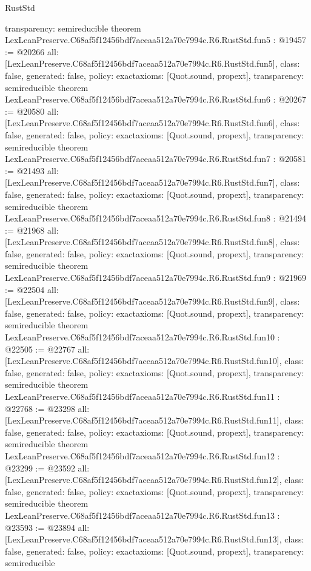 \begin{lexlean}{RustStd}
\begin{coremodule}
{  transparency: semireducible
}
theorem LexLeanPreserve.C68af5f12456bdf7aceaa512a70e7994c.R6.RustStd.fun5 : @19457 := @20266 {
  all: [LexLeanPreserve.C68af5f12456bdf7aceaa512a70e7994c.R6.RustStd.fun5],
  class: false,
  generated: false,
  policy: exact{axioms: [Quot.sound, propext]},
  transparency: semireducible
}
theorem LexLeanPreserve.C68af5f12456bdf7aceaa512a70e7994c.R6.RustStd.fun6 : @20267 := @20580 {
  all: [LexLeanPreserve.C68af5f12456bdf7aceaa512a70e7994c.R6.RustStd.fun6],
  class: false,
  generated: false,
  policy: exact{axioms: [Quot.sound, propext]},
  transparency: semireducible
}
theorem LexLeanPreserve.C68af5f12456bdf7aceaa512a70e7994c.R6.RustStd.fun7 : @20581 := @21493 {
  all: [LexLeanPreserve.C68af5f12456bdf7aceaa512a70e7994c.R6.RustStd.fun7],
  class: false,
  generated: false,
  policy: exact{axioms: [Quot.sound, propext]},
  transparency: semireducible
}
theorem LexLeanPreserve.C68af5f12456bdf7aceaa512a70e7994c.R6.RustStd.fun8 : @21494 := @21968 {
  all: [LexLeanPreserve.C68af5f12456bdf7aceaa512a70e7994c.R6.RustStd.fun8],
  class: false,
  generated: false,
  policy: exact{axioms: [Quot.sound, propext]},
  transparency: semireducible
}
theorem LexLeanPreserve.C68af5f12456bdf7aceaa512a70e7994c.R6.RustStd.fun9 : @21969 := @22504 {
  all: [LexLeanPreserve.C68af5f12456bdf7aceaa512a70e7994c.R6.RustStd.fun9],
  class: false,
  generated: false,
  policy: exact{axioms: [Quot.sound, propext]},
  transparency: semireducible
}
theorem LexLeanPreserve.C68af5f12456bdf7aceaa512a70e7994c.R6.RustStd.fun10 : @22505 := @22767 {
  all: [LexLeanPreserve.C68af5f12456bdf7aceaa512a70e7994c.R6.RustStd.fun10],
  class: false,
  generated: false,
  policy: exact{axioms: [Quot.sound, propext]},
  transparency: semireducible
}
theorem LexLeanPreserve.C68af5f12456bdf7aceaa512a70e7994c.R6.RustStd.fun11 : @22768 := @23298 {
  all: [LexLeanPreserve.C68af5f12456bdf7aceaa512a70e7994c.R6.RustStd.fun11],
  class: false,
  generated: false,
  policy: exact{axioms: [Quot.sound, propext]},
  transparency: semireducible
}
theorem LexLeanPreserve.C68af5f12456bdf7aceaa512a70e7994c.R6.RustStd.fun12 : @23299 := @23592 {
  all: [LexLeanPreserve.C68af5f12456bdf7aceaa512a70e7994c.R6.RustStd.fun12],
  class: false,
  generated: false,
  policy: exact{axioms: [Quot.sound, propext]},
  transparency: semireducible
}
theorem LexLeanPreserve.C68af5f12456bdf7aceaa512a70e7994c.R6.RustStd.fun13 : @23593 := @23894 {
  all: [LexLeanPreserve.C68af5f12456bdf7aceaa512a70e7994c.R6.RustStd.fun13],
  class: false,
  generated: false,
  policy: exact{axioms: [Quot.sound, propext]},
  transparency: semireducible
}
\end{coremodule}
\end{lexlean}
